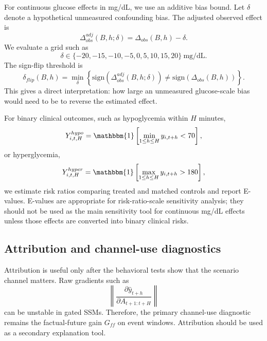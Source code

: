 For continuous glucose effects in mg/dL, we use an additive bias bound. Let $\delta$ denote a hypothetical unmeasured confounding bias. The adjusted observed effect is
\begin{equation}
    \Delta_{obs}^{adj}(B,h;\delta)
    = \Delta_{obs}(B,h) - \delta.
\end{equation}
We evaluate a grid such as
\begin{equation}
    \delta \in \{-20,-15,-10,-5,0,5,10,15,20\}\ \mathrm{mg/dL}.
\end{equation}
The sign-flip threshold is
\begin{equation}
    \delta_{flip}(B,h)=
    \min_{\delta}\left\{\mathrm{sign}(\Delta_{obs}^{adj}(B,h;\delta))\neq
    \mathrm{sign}(\Delta_{obs}(B,h))\right\}.
\end{equation}
This gives a direct interpretation: how large an unmeasured glucose-scale bias would need to be to reverse the estimated effect.

For binary clinical outcomes, such as hypoglycemia within $H$ minutes,
\begin{equation}
    Y^{hypo}_{i,t,H}=\mathbbm{1}\left[\min_{1\leq h\leq H} y_{i,t+h}<70\right],
\end{equation}
or hyperglycemia,
\begin{equation}
    Y^{hyper}_{i,t,H}=\mathbbm{1}\left[\max_{1\leq h\leq H} y_{i,t+h}>180\right],
\end{equation}
we estimate risk ratios comparing treated and matched controls and report E-values. E-values are appropriate for risk-ratio-scale sensitivity analysis; they should not be used as the main sensitivity tool for continuous mg/dL effects unless those effects are converted into binary clinical risks.

\subsection{Attribution and channel-use diagnostics}
\label{subsec:attribution_diagnostics}

Attribution is useful only after the behavioral tests show that the scenario channel matters. Raw gradients such as
\begin{equation}
    \left\|\frac{\partial \hat{y}_{t+h}}{\partial A_{t+1:t+H}}\right\|
\end{equation}
can be unstable in gated SSMs. Therefore, the primary channel-use diagnostic remains the factual-future gain $G_{ff}$ on event windows. Attribution should be used as a secondary explanation tool.

